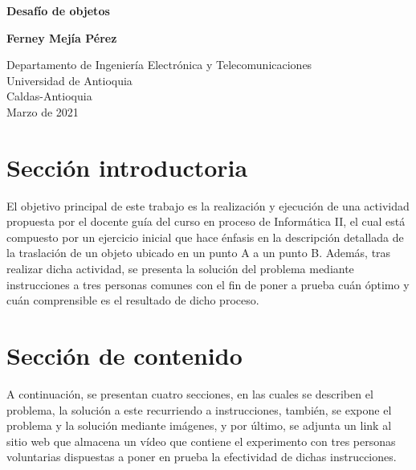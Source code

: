 \documentclass{article}
\begin{document}
\begin{titlepage}
    \begin{center}
        \vspace*{1cm}
            
        \Huge
        \textbf{Desafío de objetos}
            
        \vspace{0.5cm}
        \LARGE
            
            
        \vspace{1.5cm}
            
        \textbf{Ferney Mejía Pérez}
            
        \vfill
            
        \vspace{0.8cm}
            
        \Large
        Departamento de Ingeniería Electrónica y Telecomunicaciones\\
        Universidad de Antioquia\\
        Caldas-Antioquia\\
        Marzo de 2021
            
    \end{center}
\end{titlepage}

\tableofcontents
\newpage
\section{Sección introductoria}\label{intro}
El objetivo principal de este trabajo es la realización y ejecución de una actividad propuesta por el docente guía del curso en proceso de Informática II, el cual está compuesto por un ejercicio inicial que hace énfasis en la descripción detallada de la traslación de un objeto ubicado en un punto A a un punto B. Además, tras realizar dicha actividad, se presenta la solución del problema mediante instrucciones a tres personas comunes con el fin de poner a prueba cuán óptimo y cuán comprensible es el resultado de dicho proceso.


\section{Sección de contenido} \label{contenido}
A continuación, se presentan cuatro secciones, en las cuales se describen el problema, la solución a este recurriendo a instrucciones, también, se expone el problema y la solución mediante imágenes, y por último, se adjunta un link al sitio web que almacena un vídeo que contiene el experimento con tres personas voluntarias dispuestas a poner en prueba la efectividad de dichas instrucciones.
\end{document}
